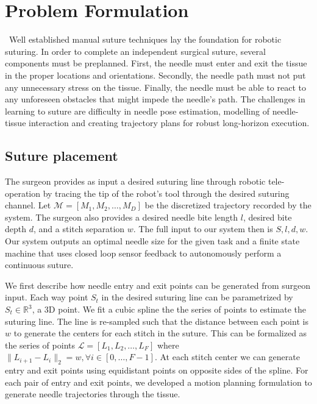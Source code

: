 \documentclass[0-suturing.tex]{subfiles}
\begin{document}
\section{Problem Formulation}
\label{sec:problem}
\
Well established manual suture techniques lay the foundation for robotic suturing. In order to complete an independent surgical suture, several components must be preplanned. First, the needle
must enter and exit the tissue in the proper locations and
orientations. Secondly, the needle path must not put any
unnecessary stress on the tissue. Finally, the needle must be
able to react to any unforeseen obstacles that might impede
the needle’s path.
The challenges in learning to suture are difficulty in needle pose estimation, modelling of needle-tissue interaction and creating trajectory plans for robust long-horizon execution. 

\subsection{Suture placement}
The surgeon provides as input a desired suturing line through robotic tele-operation by tracing the tip of the robot's tool through the desired
suturing channel. Let $\mathcal{M} = [M_1, M_2, \ldots, M_D]$ be the discretized trajectory recorded by the system. The surgeon also provides a desired needle bite length $l$, desired bite depth $d$, and a stitch separation $w$.
The full input to our system then is $S,l,d,w$.
Our system outputs an optimal needle size for the given task and  a finite state machine that uses closed loop sensor feedback to autonomously perform a continuous suture. 

We first describe how needle entry and exit points can be generated from surgeon input. Each way point $S_t$ in the desired suturing line can be parametrized by $S_t \in \mathbb{R}^3$, a 3D point. We fit a cubic spline the the series of points to estimate the suturing line. The line is re-sampled such that the distance between each point is $w$ to generate the centers for each stitch in the suture. This can be formalized as the series of points $\mathcal{L} = [L_1, L_2, \ldots, L_F] $ where $ \|L_{i+1} - L_{i}\|_2 = w, \forall i \in [0, \dots, F-1]$. At each stitch center we can generate entry and exit points using equidistant points on opposite sides of the spline.
For each pair of entry and exit points, we developed a motion planning formulation to generate needle trajectories through the tissue.
\end{document}
